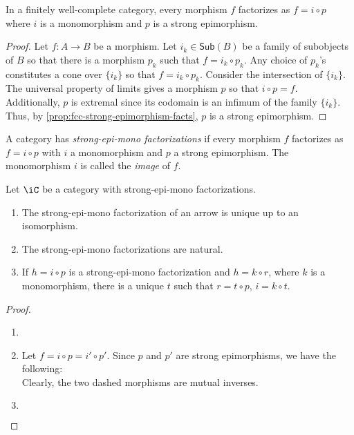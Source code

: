 \documentclass{amsart}
\begin{document}
\begin{prop}
  In a finitely well-complete category, every morphism $f$ factorizes as $f = i \circ p$ where $i$ is a monomorphism and $p$ is a strong epimorphism.
\end{prop}
\begin{proof}
  Let $f : A \to B$ be a morphism.
  Let $i_{k} \in \mathsf{Sub}(B)$ be a family of subobjects of $B$ so that there is a morphism $p_{k}$ such that $f = i_{k} \circ p_{k}$.
  Any choice of $p_{k}$'s constitutes a cone over $\{i_{k}\}$ so that $f = i_{k} \circ p_{k}$.
  Consider the intersection of $\{i_{k}\}$.
  The universal property of limits gives a morphism $p$ so that $i \circ p = f$.
  \[\]
  Additionally, $p$ is extremal since its codomain is an infimum of the family $\{i_{k}\}$.
  Thus, by \cref{prop:fcc-strong-epimorphism-facts}, $p$ is a strong epimorphism.
\end{proof}

\begin{defn}
  A category has \emph{strong-epi-mono factorizations} if every morphism $f$ factorizes as $f = i \circ p$ with $i$ a monomorphism and $p$ a strong epimorphism.
  The monomorphism $i$ is called the \emph{image} of $f$.
\end{defn}

\begin{prop}
  Let $\iC$ be a category with strong-epi-mono factorizations.
  \begin{enumerate}
  \item The strong-epi-mono factorization of an arrow is unique up to an isomorphism.
  \item The strong-epi-mono factorizations are natural.
  \item If $h = i \circ p$ is a strong-epi-mono factorization and $h = k \circ r$, where $k$ is a monomorphism, there is a unique $t$ such that $r = t \circ p$, $i = k \circ t$.
  \end{enumerate}
\end{prop}
\begin{proof}
  \begin{enumerate}
  \item[]
  \item Let $f = i \circ p = i' \circ p'$.
    Since $p$ and $p'$ are strong epimorphisms, we have the following:
    \[\]
    Clearly, the two dashed morphisms are mutual inverses.
  \item \[\]
  \end{enumerate}
\end{proof}
\end{document}
